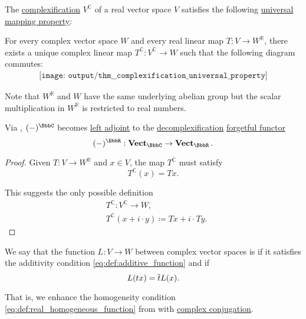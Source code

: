\begin{theorem}\label{thm:complexification_universal_property}
  The \hyperref[def:complexification]{complexification} \( V^\BbbC \) of a real vector space \( V \) satisfies the following \hyperref[rem:universal_mapping_property]{universal mapping property}:
  \begin{displayquote}
    For every complex vector space \( W \) and every real linear map \( T: V \to W^\BbbR \), there exists a unique complex linear map \( T^\BbbC: V^\BbbC \to W \) such that the following diagram commutes:
    \begin{equation}\label{eq:thm:complexification_universal_property/diagram}
      \begin{aligned}
        \texttt{[image: output/thm\_\_complexification\_universal\_property]}
      \end{aligned}
    \end{equation}
  \end{displayquote}

  Note that \( W^\BbbR \) and \( W \) have the same underlying abelian group but the scalar multiplication in \( W^\BbbR \) is restricted to real numbers.

  Via , \( (\anon*)^\BbbC \) becomes \hyperref[def:category_adjunction]{left adjoint} to the \hyperref[def:complexification]{decomplexification} \hyperref[def:concrete_category]{forgetful functor}
  \begin{equation*}
    (\anon*)^\BbbR: \cat{Vect}_\BbbC \to \cat{Vect}_\BbbR.
  \end{equation*}
\end{theorem}
\begin{proof}
  Given \( T: V \to W^\BbbR \) and \( x \in V \), the map \( T^\BbbC \) must satisfy
  \begin{equation*}
    T^\BbbC(x) = Tx.
  \end{equation*}

  This suggests the only possible definition
  \begin{equation*}
    \begin{aligned}
      &T^\BbbC: V^\BbbC \to W, \\
      &T^\BbbC(x + i \cdot y) \coloneqq Tx + i \cdot Ty.
    \end{aligned}
  \end{equation*}
\end{proof}

\begin{definition}\label{def:antilinear_function}\mimprovised
  We say that the function \( L: V \to W \) between complex vector spaces is  if it satisfies the additivity condition \eqref{eq:def:additive_function} and if
  \begin{equation}\label{eq:def:antilinear_function}
    L(tx) = \oline t L(x).
  \end{equation}

  That is, we enhance the homogeneity condition \eqref{eq:def:real_homogeneous_function} from  with \hyperref[def:complex_numbers]{complex conjugation}.
\end{definition}

